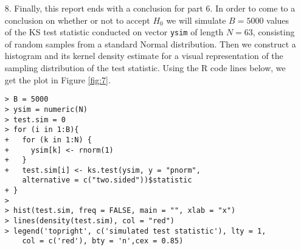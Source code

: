 \documentclass[11pt,a4]{article}
\begin{document}
\begin{itemize}
To make a meaningful analysis we superimpose the plot with the Normal cdf as well as mark where the KS statistic occurs. This is done by the following R code lines;

\begin{verbatim}
> x2 = seq(from=-4, to=4, length.out=600)
> px2 = pnorm(x2)
> 
> plot(std.res.ord, (1:N)/N, type="s", xlim=c(-4, 4), xlab="x", ylab="")
> segments(x0 = std.res.ord[1], y0 = 0, x1 = std.res.ord[1], y1 = 1/N, 
    col = "black")
> segments(x0 = std.res.ord[n], y0 = 1, x1 = 4, y1 = 1, col="black")
> 
> lines(x2, px2, col="blue")
> legend('topleft', c('empirical cumulative distribution function',
    'standard normal cdf'), lty=1 ,col=c('black', 'blue'), 
    bty='n',cex= 0.85)
> mtext(text = expression(hat(F)[n](x)), side = 2, line = 2.5)
\end{verbatim}	

\begin{figure}[hbt!]
    \centering
    \texttt{[image: ecdf\&cdf.pdf]}
    \caption{Empirical cdf of the standardised residuals superimposed by the N (0, 1) cdf}
    \label{fig:6}
\end{figure}

Based on Figure \ref{fig:6}, we note that the variability of the empirical cdf compared to the Normal cdf is fairly small, as they seem to be pretty close to each other. However, there are a few instances where $\hat{F}_{n}(x)$ looks to be quite far off from the Normal cdf. This is where we are able to locate where the KS statistic occurs, at the standardised residual valued -0.4214. Here, $\hat{F}_{n}(x)$ is larger than the distribution specified under $H_{0}$ in part 6 by 0.1077 stated in the legend.

\item[8.]
Finally, this report ends with a conclusion for part 6. In order to come to a conclusion on whether or not to accept $H_{0}$ we will simulate $B = 5000$ values of the KS test statistic conducted on vector \verb|ysim| of length $N = 63$, consisting of random samples from a standard Normal distribution. Then we construct a histogram and its kernel density estimate for a visual representation of the sampling distribution of the test statistic. Using the R code lines below, we get the plot in Figure \ref{fig:7}.

\begin{verbatim}
> B = 5000
> ysim = numeric(N)
> test.sim = 0
> for (i in 1:B){
+   for (k in 1:N) {
+     ysim[k] <- rnorm(1)
+   }
+   test.sim[i] <- ks.test(ysim, y = "pnorm",  
    alternative = c("two.sided"))$statistic
+ }
> 
> hist(test.sim, freq = FALSE, main = "", xlab = "x")
> lines(density(test.sim), col = "red")
> legend('topright', c('simulated test statistic'), lty = 1,
    col = c('red'), bty = 'n',cex = 0.85)
\end{verbatim}


\end{itemize}
\end{document}
